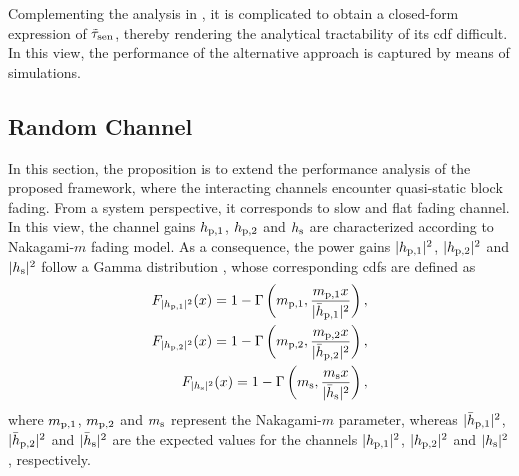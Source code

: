 \begin{remark} \label{rm:rem2} 
\normalfont
Complementing the analysis in \cite{Liang08}, it is complicated to obtain a closed-form expression of $\tilde{\tau}_{\text{sen}}$, thereby rendering the analytical tractability of its cdf difficult. In this view, the performance of the alternative approach is captured by means of simulations.
\end{remark} 

\subsection{Random Channel} \label{ssec_IS:ran_th}
In this section, the proposition is to extend the performance analysis of the proposed framework, where the interacting channels encounter quasi-static block fading. From a system perspective, it corresponds to slow and flat fading channel. In this view, the channel gains $h_{\text{p,1}}$, $h_{\text{p,2}}$ and $h_{\text{s}}$ are characterized according to Nakagami-$m$ fading model. As a consequence, the power gains $|h_{\text{p,1}}|^2$, $|h_{\text{p,2}}|^2$ and $|h_{\text{s}}|^2$ follow a Gamma distribution \cite{Goldsmith05}, whose corresponding cdfs are defined as
\begin{align}
F_{|h_{\text{p,1}}|^2}(x) = 1 - \Gamma\left(m_{\text{p,1}}, \frac{m_{\text{p,1}} x}{|\bar{h}_{\text{p,1}}|^2}\right), \label{eq_IS:dis_phpo}\\
F_{|h_{\text{p,2}}|^2}(x) = 1 - \Gamma\left(m_{\text{p,2}}, \frac{m_{\text{p,2}} x}{|\bar{h}_{\text{p,2}}|^2}\right), \label{eq_IS:dis_pght}\\  
F_{|h_{\text{s}}|^2}(x) = 1 - \Gamma\left(m_{\text{s}} , \frac{m_{\text{s}} x}{|\bar{h}_{\text{s}}|^2}\right), \label{eq_IS:dis_phs}
\end{align}
where $m_{\text{p,1}}$, $m_{\text{p,2}}$ and $m_{\text{s}}$ represent the Nakagami-$m$ parameter, whereas $|\bar{h}_{\text{p,1}}|^2$, $|\bar{h}_{\text{p,2}}|^2$ and $|\bar{h}_{\text{s}}|^2$ are the expected values for the channels $|h_{\text{p,1}}|^2$, $|h_{\text{p,2}}|^2$ and $|h_{\text{s}}|^2$, respectively. 

